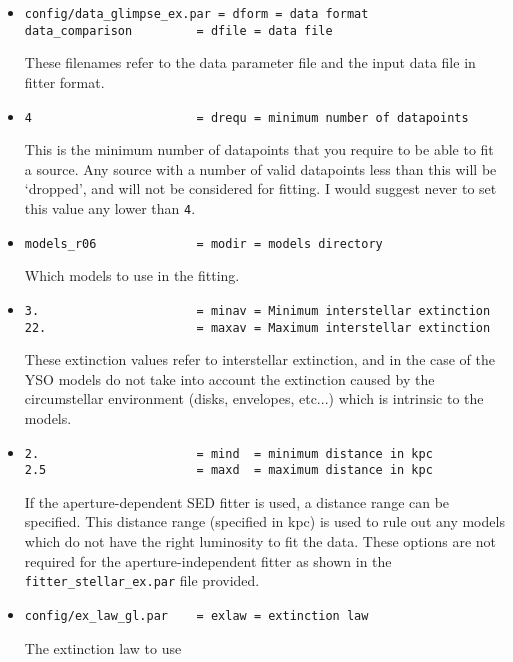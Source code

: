 \documentclass[letterpaper,11pt]{report}
\begin{document}
\begin{itemize}
\item
\begin{verbatim}
config/data_glimpse_ex.par = dform = data format
data_comparison         = dfile = data file
\end{verbatim}
These filenames refer to the data parameter file and the input data file in fitter format.

\item
\begin{verbatim}
4                       = drequ = minimum number of datapoints
\end{verbatim}
This is the minimum number of datapoints that you require to be able to fit a source. Any source with a number of valid datapoints less than this will be `dropped', and will not be considered for fitting. I would suggest never to set this value any lower than \texttt{4}.

\item
\begin{verbatim}
models_r06              = modir = models directory
\end{verbatim}
Which models to use in the fitting.

\item
\begin{verbatim}
3.                      = minav = Minimum interstellar extinction
22.                     = maxav = Maximum interstellar extinction
\end{verbatim}
These extinction values refer to interstellar extinction, and in the case of the YSO models do not take into account the extinction caused by the circumstellar environment (disks, envelopes, etc...) which is intrinsic to the models.

\item
\begin{verbatim}
2.                      = mind  = minimum distance in kpc
2.5                     = maxd  = maximum distance in kpc
\end{verbatim}

If the aperture-dependent SED fitter is used, a distance range can be specified. This distance range (specified in kpc) is used to rule out any models which do not have the right luminosity to fit the data. These options are not required for the aperture-independent fitter as shown in the \texttt{fitter\_stellar\_ex.par} file provided. 

\item
\begin{verbatim}
config/ex_law_gl.par    = exlaw = extinction law
\end{verbatim}
The extinction law to use


\end{itemize}
\end{document}
